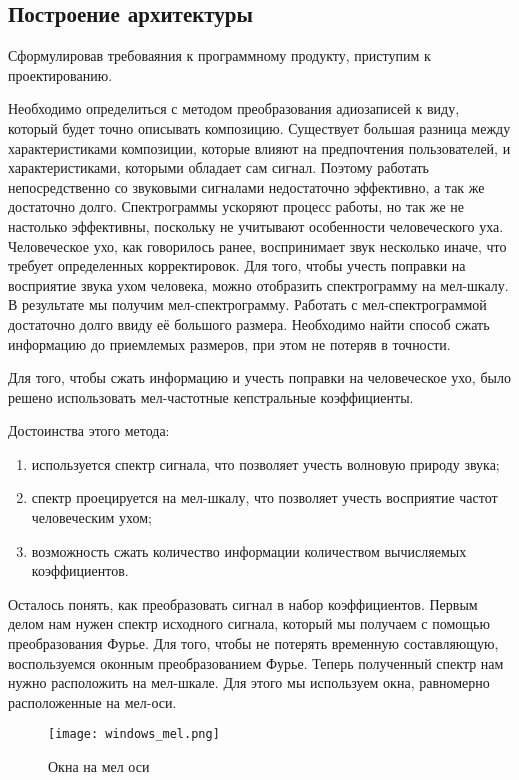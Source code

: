 \subsection{Построение архитектуры}
\label{sec:design:dev}

Сформулировав требоваяния к программному продукту, приступим к проектированию.

Необходимо определиться с методом преобразования адиозаписей к виду, который будет точно описывать композицию. Существует большая разница между характеристиками композиции, которые влияют на предпочтения пользователей, и характеристиками, которыми обладает сам сигнал. Поэтому работать непосредственно со звуковыми сигналами недостаточно эффективно, а так же достаточно долго. Спектрограммы ускоряют процесс работы, но так же не настолько эффективны, поскольку не учитывают особенности человеческого уха. Человеческое ухо, как говорилось ранее, воспринимает звук несколько иначе, что требует определенных корректировок. Для того, чтобы учесть поправки на восприятие звука ухом человека, можно отобразить спектрограмму на мел-шкалу. В результате мы получим мел-спектрограмму. Работать с мел-спектрограммой достаточно долго ввиду её большого размера. Необходимо найти способ сжать информацию до приемлемых размеров, при этом не потеряв в точности.

Для того, чтобы сжать информацию и учесть поправки на человеческое ухо, было решено использовать мел-частотные кепстральные коэффициенты.

Достоинства этого метода:
\begin{enumerate}
  \item используется спектр сигнала, что позволяет учесть волновую природу звука;
  \item спектр проецируется на мел-шкалу, что позволяет учесть восприятие частот человеческим ухом;
  \item возможность сжать количество информации количеством вычисляемых коэффициентов.
\end{enumerate}

Осталось понять, как преобразовать сигнал в набор коэффициентов. Первым делом нам нужен спектр исходного сигнала, который мы получаем с помощью преобразования Фурье. Для того, чтобы не потерять временную составляющую, воспользуемся оконным преобразованием Фурье. Теперь полученный спектр нам нужно расположить на мел-шкале. Для этого мы используем окна, равномерно расположенные на мел-оси.

\begin{figure}
\centering
	\texttt{[image: windows\_mel.png]}
	\caption{Окна на мел оси}
	\label{sec:design:dev:windows_mel}
\end{figure}

